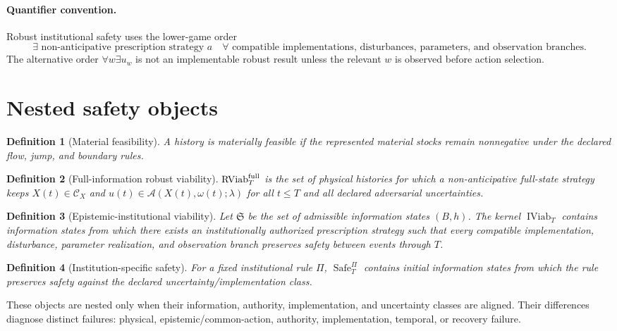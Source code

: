 \documentclass[11pt]{article}
\newtheorem{definition}{Definition}
\begin{document}
\paragraph{Quantifier convention.} Robust institutional safety uses the lower-game order
\[
\exists\text{ non-anticipative prescription strategy }a
\quad\forall\text{ compatible implementations, disturbances, parameters, and observation branches}.
\]
The alternative order $\forall w\exists u_w$ is not an implementable robust result unless the relevant $w$ is observed before action selection.

\section{Nested safety objects}
\begin{definition}[Material feasibility]
A history is materially feasible if the represented material stocks remain nonnegative under the declared flow, jump, and boundary rules.
\end{definition}

\begin{definition}[Full-information robust viability]
$\operatorname{RViab}^{\rm full}_T$ is the set of physical histories for which a non-anticipative full-state strategy keeps $X(t)\in\mathcal C_X$ and $u(t)\in\mathcal A(X(t),\omega(t);\lambda)$ for all $t\le T$ and all declared adversarial uncertainties.
\end{definition}

\begin{definition}[Epistemic-institutional viability]
Let $\mathfrak S$ be the set of admissible information states $(B,h)$. The kernel $\operatorname{IViab}_T$ contains information states from which there exists an institutionally authorized prescription strategy such that every compatible implementation, disturbance, parameter realization, and observation branch preserves safety between events through $T$.
\end{definition}

\begin{definition}[Institution-specific safety]
For a fixed institutional rule $\Pi$, $\operatorname{Safe}^{\Pi}_T$ contains initial information states from which the rule preserves safety against the declared uncertainty/implementation class.
\end{definition}

These objects are nested only when their information, authority, implementation, and uncertainty classes are aligned. Their differences diagnose distinct failures: physical, epistemic/common-action, authority, implementation, temporal, or recovery failure.
\end{document}
